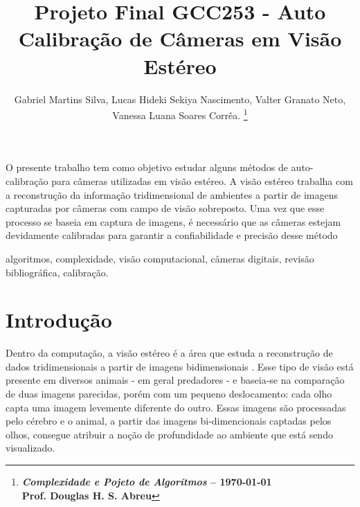 \documentclass[portuguese]{sbrt}
\begin{document}
 
  
\title{Projeto Final GCC253 - Auto Calibração de Câmeras em Visão Estéreo} 
  
\author{Gabriel Martins Silva, Lucas Hideki Sekiya Nascimento, Valter Granato Neto, Vanessa Luana Soares Corrêa. 
\thanks{\centering \textbf{\textit{Complexidade e Pojeto de Algorítmos} -- \today \\ Prof. Douglas H. S. Abreu}}%
} 
  
\maketitle 

  
  
  
  
\begin{resumo} 
O presente trabalho tem como objetivo estudar alguns métodos de auto-calibração para câmeras utilizadas em visão estéreo. A visão estéreo trabalha com a reconstrução da informação tridimensional de ambientes a partir de imagens capturadas por câmeras com campo de visão sobreposto. Uma vez que esse processo se baseia em captura de imagens, é necessário que as câmeras estejam devidamente calibradas para garantir a confiabilidade e precisão desse método
\end{resumo} 
\begin{chave} 
algoritmos, complexidade, visão computacional, câmeras digitais, revisão bibliográfica, calibração. 
\end{chave} 
  

  
  

\section{Introdução} 
\label{sec:introducao} 
  
Dentro da computação, a visão estéreo é a área que estuda a reconstrução de dados tridimensionais a partir de imagens bidimensionais \cite{MadalenaMenotti}. Esse tipo de visão está presente em diversos animais - em geral predadores - e baseia-se na comparação de duas imagens parecidas, porém com um pequeno deslocamento: cada olho capta uma imagem levemente diferente do outro. Essas imagens são processadas pelo cérebro e o animal, a partir das imagens bi-dimencionais captadas pelos olhos, consegue atribuir a noção de profundidade ao ambiente que está sendo visualizado.
\end{document}
